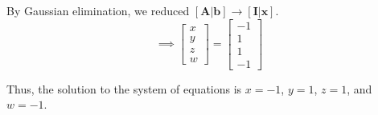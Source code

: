 By Gaussian elimination, we reduced \( [\mathbf{A} | \mathbf{b}] \longrightarrow [\mathbf{I} | \mathbf{x}] \).
\[
    \implies
    \begin{bmatrix}
        x \\
        y \\
        z \\
        w
    \end{bmatrix}
    =
    \begin{bmatrix}
        -1 \\
        1  \\
        1  \\
        -1
    \end{bmatrix}
\]

Thus, the solution to the system of equations is \( x = -1 \), \( y = 1 \), \( z = 1 \), and \( w = -1 \).
